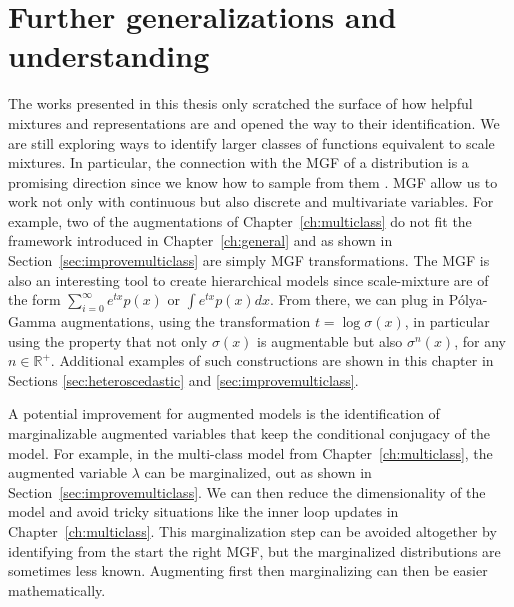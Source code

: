 

\graphicspath{{8/figures/}}


\section{Further generalizations and understanding}
The works presented in this thesis only scratched the surface of how helpful mixtures and representations are and opened the way to their identification.
We are still exploring ways to identify larger classes of functions equivalent to scale mixtures.
In particular, the connection with the \acf{MGF} of a distribution is a promising direction since we know how to sample from them \cite{ridout2009generating}.
\ac{MGF} allow us to work not only with continuous but also discrete and multivariate variables.
For example, two of the augmentations of Chapter~\ref{ch:multiclass} do not fit the framework introduced in Chapter~\ref{ch:general} and as shown in Section~\ref{sec:improvemulticlass} are simply \ac{MGF} transformations.
The \ac{MGF} is also an interesting tool to create hierarchical models since scale-mixture are of the form $\sum_{i=0}^\infty e^{tx} p(x)$ or $\int e^{tx}p(x)dx$.
From there, we can plug in P\'olya-Gamma augmentations, using the transformation $t=\log \sigma(x)$, in particular using the property that not only $\sigma(x)$ is augmentable but also $\sigma^n(x)$, for any $n\in \mathbb{R}^+$.
Additional examples of such constructions are shown in this chapter in Sections \ref{sec:heteroscedastic} and \ref{sec:improvemulticlass}.

A potential improvement for augmented models is the identification of marginalizable augmented variables that keep the conditional conjugacy of the model.
For example, in the multi-class model from Chapter~\ref{ch:multiclass}, the augmented variable $\lambda$ can be marginalized, out as shown in Section~\ref{sec:improvemulticlass}.
We can then reduce the dimensionality of the model and avoid tricky situations like the inner loop updates in Chapter~\ref{ch:multiclass}.
This marginalization step can be avoided altogether by identifying from the start the right \ac{MGF}, but the marginalized distributions are sometimes less known.
Augmenting first then marginalizing can then be easier mathematically.

